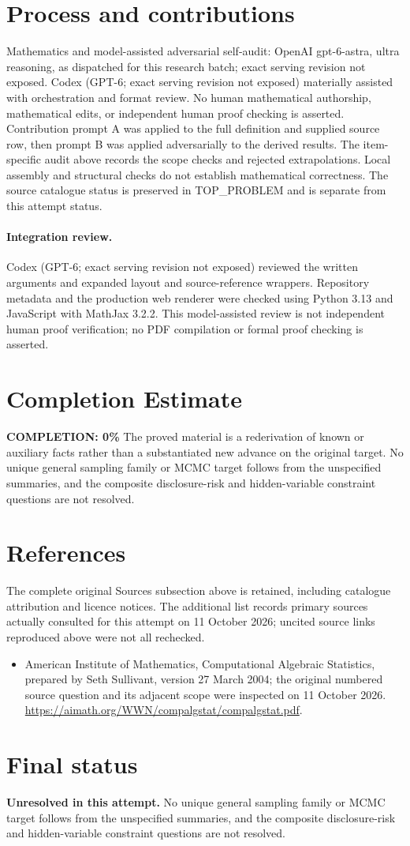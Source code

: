 \documentclass[11pt]{article}
\begin{document}
\section{Process and contributions}
Mathematics and model-assisted adversarial self-audit: OpenAI gpt-6-astra, ultra reasoning, as dispatched for this research batch; exact serving revision not exposed. Codex (GPT-6; exact serving revision not exposed) materially assisted with orchestration and format review. No human mathematical authorship, mathematical edits, or independent human proof checking is asserted.
Contribution prompt A was applied to the full definition and supplied source row, then prompt B was applied adversarially to the derived results. The item-specific audit above records the scope checks and rejected extrapolations. Local assembly and structural checks do not establish mathematical correctness. The source catalogue status is preserved in TOP\_PROBLEM and is separate from this attempt status.
\paragraph{Integration review.} Codex (GPT-6; exact serving revision not exposed) reviewed the written arguments and expanded layout and source-reference wrappers. Repository metadata and the production web renderer were checked using Python 3.13 and JavaScript with MathJax 3.2.2. This model-assisted review is not independent human proof verification; no PDF compilation or formal proof checking is asserted.

\section{Completion Estimate}
\noindent\textbf{COMPLETION: 0\%}
The proved material is a rederivation of known or auxiliary facts rather than a substantiated new advance on the original target. No unique general sampling family or MCMC target follows from the unspecified summaries, and the composite disclosure-risk and hidden-variable constraint questions are not resolved.
\section{References}
The complete original Sources subsection above is retained, including catalogue attribution and licence notices. The additional list records primary sources actually consulted for this attempt on 11 October 2026; uncited source links reproduced above were not all rechecked.
\begin{itemize}
\item American Institute of Mathematics, Computational Algebraic Statistics, prepared by Seth Sullivant, version 27 March 2004; the original numbered source question and its adjacent scope were inspected on 11 October 2026. \url{https://aimath.org/WWN/compalgstat/compalgstat.pdf}.
\end{itemize}
\section{Final status}
\textbf{Unresolved in this attempt.} No unique general sampling family or MCMC target follows from the unspecified summaries, and the composite disclosure-risk and hidden-variable constraint questions are not resolved.
\end{document}
